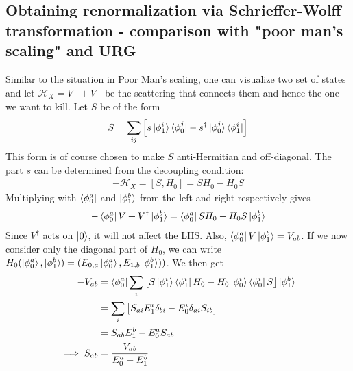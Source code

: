 \subsection{Obtaining renormalization via Schrieffer-Wolff transformation - comparison with "poor man's scaling" and URG}
Similar to the situation in Poor Man's scaling, one can visualize two set of states and let \(\mathcal{H}_X = V_+ + V_-\) be the scattering that connects them and hence the one we want to kill. Let \(S\) be of the form 
\begin{equation}\begin{aligned}
	S = \sum_{ij}\left[s\ket{\phi_1^i}\bra{\phi_0^j} - s^\dagger\ket{\phi_0^j}\bra{\phi_1^i}\right]
\end{aligned}\end{equation}
This form is of course chosen to make \(S\) anti-Hermitian and off-diagonal. The part \(s\) can be determined from the decoupling condition:
\begin{equation}\begin{aligned}
	-\mathcal{H}_X = \left[S, H_0\right] = S H_0 - H_0 S
\end{aligned}\end{equation}
Multiplying with \(\bra{\phi_0^a}\) and \(\ket{\phi_1^b}\) from the left and right respectively gives
\begin{equation}\begin{aligned}
-\bra{\phi_0^a}V + V^\dagger\ket{\phi_1^b} &= \bra{\phi_0^a}S H_0 - H_0 S\ket{\phi_1^b}\\
\end{aligned}\end{equation}
Since \(V^\dagger\) acts on \(\ket{0}\), it will not affect the LHS. Also, \(\bra{\phi_0^a}V\ket{\phi_1^b} = V_{ab}\). If we now consider only the diagonal part of \(H_0\), we can write \(H_0 (\ket{\phi_0^a},\ket{\phi_1^b}) = (E_{0,a}\ket{\phi_0^a},E_{1,b}\ket{\phi_1^b}))\). We then get
\begin{equation}\begin{aligned}
	-V_{ab} &= \bra{\phi_0^a}\sum_i\left[S\ket{\phi_1^i}\bra{\phi_1^i} H_0 - H_0 \ket{\phi_0^i}\bra{\phi_0^i}S\right]\ket{\phi_1^b}\\
		&= \sum_i\left[S_{ai}E_1^i \delta_{bi} - E^i_0 \delta_{ai}S_{ib}\right]\\
    &= S_{ab}E_1^b  - E^a_0 S_{ab}\\
\implies S_{ab} &= \frac{V_{ab}}{E_0^a - E_1^b}
\end{aligned}\end{equation}
